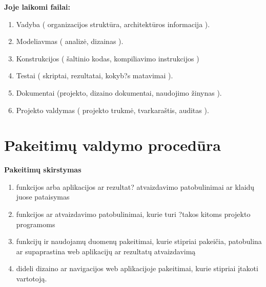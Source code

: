 \documentclass[a4paper,12pt]{article}
\begin{document}
\large\textbf{Joje laikomi failai:}
\normalsize
\begin{enumerate}

	\item Vadyba ( organizacijos strukt\= ura, architekt\= uros informacija ).
	\item Modeliavmas ( analiz\. e, dizainas ).
	\item Konstrukcijos ( \v saltinio kodas, kompiliavimo instrukcijos )
	\item Testai ( skriptai, rezultatai, kokyb?s matavimai ).
	\item Dokumentai (projekto, dizaino dokumentai, naudojimo \v zinynas ).
	\item Projekto valdymas ( projekto trukm\. e, tvarkara\v stis, auditas ).
		
\end{enumerate}
\clearpage 


\section{Pakeitimų valdymo procedūra}

\large\textbf{Pakeitimų skirstymas}
\begin{enumerate}
	\item funkcijos arba aplikacijos ar rezultat? atvaizdavimo patobulinimai ar klaid\k u juose pataisymas
	\item funkcijos ar atvaizdavimo patobulinimai, kurie turi ?takos kitoms projekto programoms
	\item funkcij\k u ir naudojam\k u duomen\k u pakeitimai, kurie stipriai pakei\v cia, patobulina ar supaprastina web aplikacij\k u ar rezultat\k u atvaizdavim\k a
	\item dideli dizaino ar navigacijos web aplikacijoje pakeitimai, kurie stipriai \k itakoti vartotoj\k a.
\end{enumerate}
\end{document}

